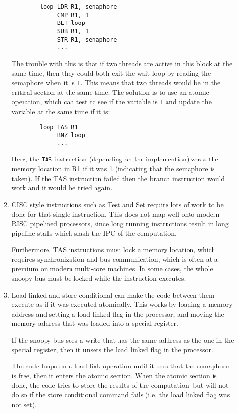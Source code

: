 \documentclass{report}
\begin{document}
\begin{enumerate}
\begin{enumerate}
      \begin{verbatim}
        loop LDR R1, semaphore
             CMP R1, 1
             BLT loop
             SUB R1, 1
             STR R1, semaphore
             ...
      \end{verbatim}

      The trouble with this is that if two threads are active in this
      block at the same time, then they could both exit the wait loop
      by reading the semaphore when it is $1$. This means that two
      threads would be in the critical section at the same time. The
      solution is to use an atomic operation, which can test to see if
      the variable is $1$ and update the variable at the same time if
      it is:

      \begin{verbatim}
        loop TAS R1
             BNZ loop
             ...
      \end{verbatim}

      Here, the \texttt{TAS} instruction (depending on the
      implemention) zeros the memory location in R1 if it was 1
      (indicating that the semaphore is taken). If the TAS instruction
      failed then the branch instruction would work and it would be
      tried again.
    \item CISC style instructions such as Test and Set require lots of
      work to be done for that single instruction. This does not map
      well onto modern RISC pipelined processors, since long running
      instructions result in long pipeline stalls which slash the IPC
      of the computation.

      Furthermore, TAS instructions must lock a memory location, which
      requires synchronization and bus communication, which is often
      at a premium on modern multi-core machines. In some cases, the
      whole snoopy bus must be locked while the instruction executes.
    \item Load linked and store conditional can make the code between
      them execute as if it was executed atomically. This works by
      loading a memory address and setting a load linked flag in the
      processor, and moving the memory address that was loaded into
      a special register.

      If the snoopy bus sees a write that has the same address as the
      one in the special register, then it unsets the load linked flag
      in the processor.

      The code loops on a load link operation until it sees that the
      semaphore is free, then it enters the atomic section. When the
      atomic section is done, the code tries to store the results of
      the computation, but will not do so if the store conditional
      command fails (i.e. the load linked flag was not set).


\end{enumerate}
\end{enumerate}
\end{document}
